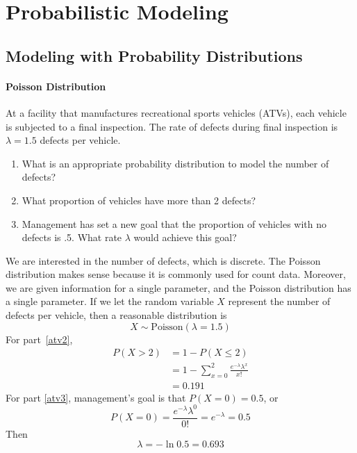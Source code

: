 \chapter{Probabilistic Modeling}

\section{Modeling with Probability Distributions}

\subsubsection*{Poisson Distribution}
At a facility that manufactures recreational sports
  vehicles (ATVs), each vehicle is subjected to a final
  inspection. The rate of defects during final inspection is
  $\lambda=1.5$ defects per vehicle.
\begin{enumerate}
\item What is an appropriate probability distribution to model the
number of defects? \label{atv1}
\item What proportion of vehicles have more than 2 defects? \label{atv2}
\item Management has set a new goal that the proportion
of vehicles with no defects is .5. What rate $\lambda$ would
achieve this goal? \label{atv3}
\end{enumerate}

We are interested in the number of defects, which is discrete.
The Poisson distribution makes sense because it is commonly used
for count data. Moreover, we are given information for a single
parameter, and the Poisson distribution has a single parameter.
If we let the random variable $X$ represent the number of defects
per vehicle, then a reasonable distribution is
\[ X \sim \text{Poisson}(\lambda=1.5) \]
For part~\ref{atv2},
\begin{align*}
P(X>2) &= 1 - P(X \leq 2)\\
       &= 1 - \sum_{x=0}^2 \frac{e^{-\lambda}\lambda^x}{x!}\\
       &= 0.191
\end{align*}
For part \ref{atv3}, management's goal is that $P(X=0)=0.5$, or
\[ P(X=0) = \frac{e^{-\lambda}\lambda^0}{0!} = e^{-\lambda}=0.5 \]
Then
\[ \lambda = -\ln{0.5} = 0.693 \]

